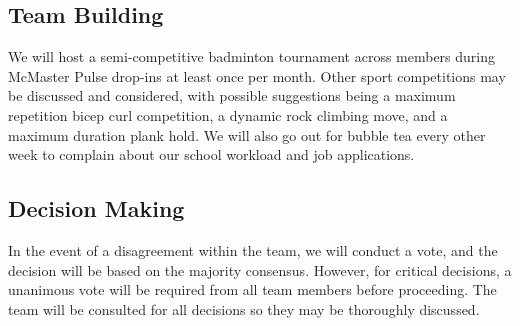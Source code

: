 \documentclass{article}
\begin{document}
\subsection{Team Building}

We will host a semi-competitive badminton tournament across members during McMaster Pulse drop-ins at least once per month. Other sport competitions may be discussed and considered, with possible suggestions being a maximum repetition bicep curl competition, a dynamic rock climbing move, and a maximum duration plank hold. We will also go out for bubble tea every other week to complain about our school workload and job applications.

\subsection{Decision Making}

In the event of a disagreement within the team, we will conduct a vote, and the decision will be based on the majority consensus. However, for critical decisions, a unanimous vote will be required from all team members before proceeding. The team will be consulted for all decisions so they may be thoroughly discussed. 
\end{document}
